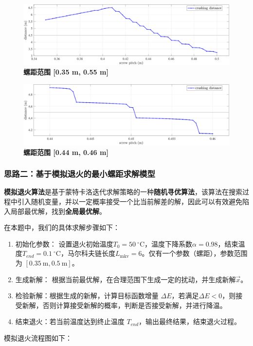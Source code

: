\documentclass[zihao=-4, UTF8]{article}		%
\theoremstyle{MyLineTheoremStyle} %
\theoremstyle{MyBlockTheoremStyle} %
\theoremstyle{MySubsubsectionStyle} %
\begin{document}
\begin{figure}[H]\centering
\includegraphics[width=\textwidth]{assets/Q3大范围.pdf}
\caption{\bfseries 螺距范围 [0.35 m, 0.55 m] }\label{螺距范围 [0.35 m, 0.55 m]}
\end{figure}
\begin{figure}[H]\centering
    \includegraphics[width=\textwidth]{assets/Q3小范围.pdf}
    \caption{\bfseries 螺距范围 [0.44 m, 0.46 m]}\label{螺距范围 [0.44 m, 0.46 m]}
    \end{figure}

\subsubsection{思路二：基于模拟退火的最小螺距求解模型}

\textbf{模拟退火算法}是基于蒙特卡洛迭代求解策略的一种\textbf{随机寻优算法}，该算法在搜索过程中引入随机变量，并以一定概率接受一个比当前解差的解，因此可以有效避免陷入局部最优解，找到\textbf{全局最优解}。

在本题中，我们的具体求解步骤如下：
\begin{enumerate}[leftmargin=4.5em]
\item 初始化参数：
设置退火初始温度$T_{0}=50\ ^\circ$C，温度下降系数$\alpha=0.98$，结束温度$T_{end}=0.1\ ^\circ$C，马尔科夫链长度$L_{\text{mkv}}=6$。仅有一个参数（螺距），参数范围为 $[0.35\ \mathrm{m}, 0.5\ \mathrm{m}]$。

\item 生成新解：
根据当前最优解，在合理范围下生成一定的扰动，并生成新解$\vec{x}$。

\item 检验新解：根据生成的新解，计算目标函数增量 $\Delta{E}$，若满足$\Delta{E}<0$，则接受新解，否则计算接受新解的概率，判断是否接受新解，并进行降温。
\item 结束退火：若当前温度达到终止温度 $T_{end}$，输出最终结果，结束退火过程。
\end{enumerate}
\vspace*{1em}
模拟退火流程图如下：
\end{document}
